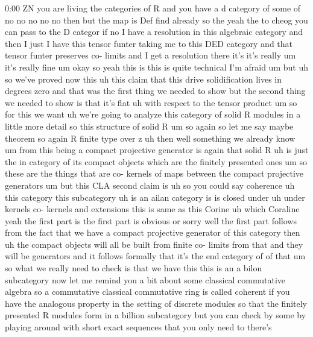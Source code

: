 \begin{unfinished}{0:00}
ZN  you  are  living  the  categories  of  R
and  you  have  a  d  category  of  some  of  no
no  no  no  no  then  but  the  map  is  Def  find
already  so  the  yeah  the  to  cheog  you  can
pass  to  the  D  categor  if  no  I  have  a
resolution  in  this  algebraic  category
and  then  I  just  I  have  this  tensor
funter  taking  me  to  this  DED  category
and  that  tensor  funter  preserves  co-
limits  and  I  get  a  resolution  there  it's
it's  really  um  it's  really  fine  um  okay
so  yeah  this  is  this  is  quite  technical
I'm  afraid  um  but  uh  so  we've  proved  now
this  uh  this  claim  that  this  drive
solidification  lives  in  degrees  zero  and
that  was  the  first  thing  we  needed  to
show  but  the  second  thing  we  needed  to
show  is  that  it's  flat  uh  with  respect
to  the  tensor
product  um  so  for  this  we  want  uh  we're
going  to  analyze  this  category  of  solid
R  modules  in  a  little  more  detail  so
this
structure
of  solid
R
um  so  again  so  let  me  say  maybe  theorem
so  again  R  finite  type  over
z  uh  then  well  something  we  already  know
um  from  this  being  a  compact  projective
generator  is  again  that  solid  R  uh  is
just  the  in  category  of  its  compact
objects  which  are  the  finitely  presented
ones
um  so  these  are  the  things  that  are  co-
kernels  of  maps  between  the  compact
projective
generators
um  but  this  CLA  second  claim  is  uh  so
you  could  say
coherence  uh  this  category  this
subcategory  uh  is  an  ailan  category  is
is  closed
under  uh  under  kernels  co-  kernels  and
extensions
this  is  same  as  this  Corine  uh  which
Coraline  yeah  the  first  part  is  the
first  part  is  obvious  or  sorry  well  the
first  part  follows  from  the  fact  that  we
have  a  compact  projective  generator  of
this  category  then  uh  the  compact
objects  will  all  be  built  from  finite
co-  limits  from  that  and  they  will  be
generators  and  it  follows  formally  that
it's  the  end  category  of  of
that
um
so  what  we  really  need  to  check  is  that
we  have  this  this  is  an  a  bilon
subcategory  now  let  me  remind  you  a  bit
about  some  classical  commutative  algebra
so  a  commutative  classical  commutative
ring  is  called  coherent  if  you  have  the
analogous  property  in  the  setting  of
discrete  modules  so  that  the  finitely
presented  R  modules  form  in  a  billion
subcategory  but  you  can  check  by  some  by
playing  around  with  short  exact
sequences  that  you  only  need  to  there's

\end{unfinished}
